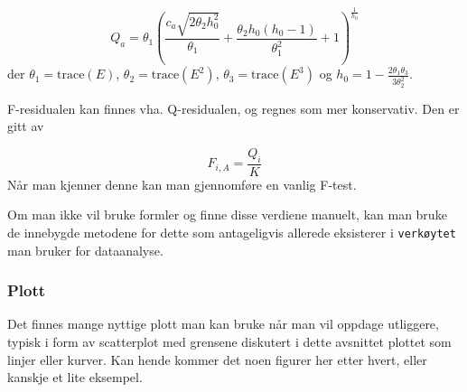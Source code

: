 \begin{equation}
Q_{a}=\theta_{1}\left(\frac{c_{a} \sqrt{2 \theta_{2} h_{0}^{2}}}{\theta_{1}}+\frac{\theta_{2} h_{0}\left(h_{0}-1\right)}{\theta_{1}^{2}}+1\right)^{\frac{1}{h_{0}}}
\end{equation}
der $\theta_1 = \textrm{trace}(E)$, $\theta_2 = \textrm{trace}(E^2)$, $\theta_3 = \textrm{trace}(E^3)$ og $h_0 = 1 - \frac{2 \theta_1 \theta_3}{3 \theta_2^2}$.

F-residualen kan finnes vha. Q-residualen, og regnes som mer konservativ. Den er gitt av

\begin{equation}
	F_{i, A} = \frac{Q_i}{K}
\end{equation}
Når man kjenner denne kan man gjennomføre en vanlig F-test.

Om man ikke vil bruke formler og finne disse verdiene manuelt, kan man bruke de innebygde metodene for dette som antageligvis allerede eksisterer i \texttt{verkøytet} man bruker for dataanalyse.

\subsubsection{Plott}
Det finnes mange nyttige plott man kan bruke når man vil oppdage utliggere, typisk i form av scatterplot med grensene diskutert i dette avsnittet plottet som linjer eller kurver. Kan hende kommer det noen figurer her etter hvert, eller kanskje et lite eksempel.
